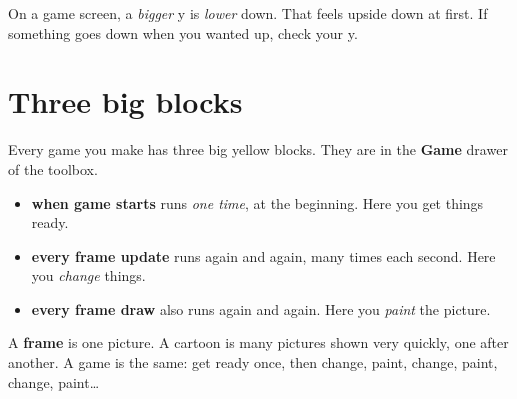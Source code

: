 \begin{center}
\label{fig:kidgrid}
\end{center}

\begin{prgwarn}
On a game screen, a \emph{bigger} y is \emph{lower} down. That feels upside
down at first. If something goes down when you wanted up, check your y.
\end{prgwarn}

\section{Three big blocks}

Every game you make has three big yellow blocks. They are in the \textbf{Game}
drawer of the toolbox.


\begin{itemize}
  \item \textbf{when game starts} runs \emph{one time}, at the beginning. Here
        you get things ready.
  \item \textbf{every frame update} runs again and again, many times each
        second. Here you \emph{change} things.
  \item \textbf{every frame draw} also runs again and again. Here you
        \emph{paint} the picture.
\end{itemize}

A \textbf{frame} is one picture. A cartoon is many pictures shown very quickly,
one after another. A game is the same: get ready once, then change, paint,
change, paint, change, paint\dots

